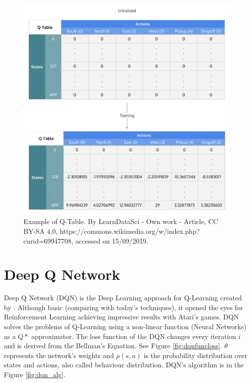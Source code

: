 \begin{figure}[H]
    \centering
    \includegraphics[scale=0.35]{images/Q-Learning_Matrix_Initialized_and_After_Training.png}
    \caption{Example of Q-Table. By LearnDataSci - Own work - Article, CC BY-SA 4.0, https://commons.wikimedia.org/w/index.php?curid=69947708, accessed on 15/09/2019.}
    \label{fig:qtable}
\end{figure}

\section{Deep Q Network}\label{section:dqn}
Deep Q Network (DQN) is the Deep Learning approach for Q-Learning created by \cite{dqn}. Although basic (comparing with today's techniques), it opened the eyes for Reinforcement Learning achieving impressive results with Atari's games. DQN solves the problems of Q-Learning using a non-linear function (Neural Networks) as a $Q*$ approximator. The loss function of the DQN changes every iteration $i$ and is derived from the Bellman's Equation. See Figure \ref{fig:dqnfuncloss}. $\theta$ represents the network's weights and $\rho(s,a)$ is the probability distribution over states and actions, also called behaviour distribution. DQN's algorithm is in the Figure \ref{fig:dqn_alg}.


